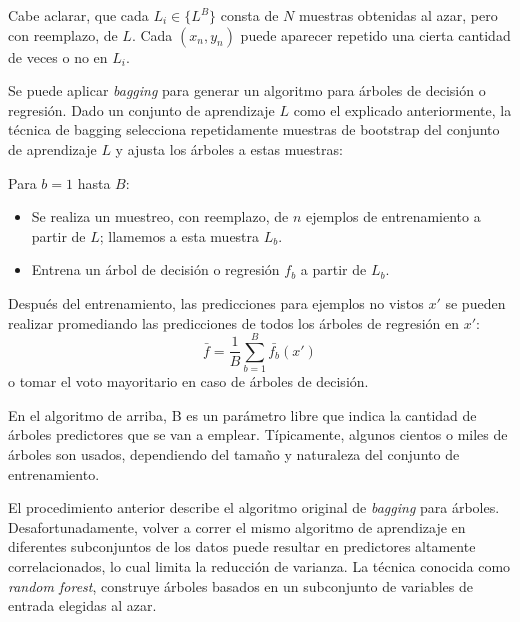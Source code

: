 	Cabe aclarar, que cada $L_i \in \{ L^{B} \}$ consta de $N$ muestras obtenidas al azar, pero con reemplazo, de $L$. Cada $(x_n, y_n)$ puede aparecer repetido una cierta cantidad de veces o no en $L_i$.

	Se puede aplicar \textit{bagging} para generar un algoritmo para árboles de decisión o regresión. Dado un conjunto de aprendizaje $L$ como el explicado anteriormente, la técnica de bagging selecciona repetidamente muestras de bootstrap del conjunto de aprendizaje $L$ y ajusta los árboles a estas muestras:

	Para $b=1$ hasta $B$:
	\begin{itemize}
		\item Se realiza un muestreo, con reemplazo, de $n$ ejemplos de entrenamiento a partir de $L$; llamemos a esta muestra $L_b$.
		\item Entrena un árbol de decisión o regresión $f_b$ a partir de $L_b$.
	\end{itemize}

	Después del entrenamiento, las predicciones para ejemplos no vistos $x'$ se pueden realizar promediando las predicciones de todos los árboles de regresión en $x'$:
	$$\bar{f} = \frac{1}{B}\sum_{b=1}^B\bar{f_b}(x')$$
	o tomar el voto mayoritario en caso de árboles de decisión.

	En el algoritmo de arriba, B es un parámetro libre que indica la cantidad de árboles predictores que se van a emplear. Típicamente, algunos cientos o miles de árboles son usados, dependiendo del tamaño y naturaleza del conjunto de entrenamiento.

	El procedimiento anterior describe el algoritmo original de \textit{bagging} para árboles. Desafortunadamente, volver a correr el mismo algoritmo de aprendizaje en diferentes subconjuntos de los datos puede resultar en predictores altamente correlacionados, lo cual limita la reducción de varianza. La técnica conocida como \textit{random forest}, construye árboles basados en un subconjunto de variables de entrada elegidas al azar.

